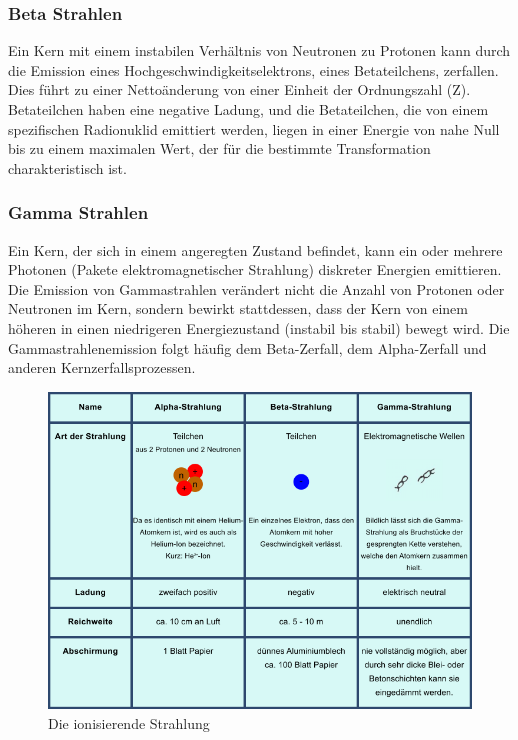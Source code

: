  \subsubsection{Beta Strahlen}
 Ein Kern mit einem instabilen Verhältnis von Neutronen zu Protonen kann durch die Emission eines Hochgeschwindigkeitselektrons, eines Betateilchens, zerfallen. Dies führt zu einer Nettoänderung von einer Einheit der Ordnungszahl (Z). Betateilchen haben eine negative Ladung, und die Betateilchen, die von einem spezifischen Radionuklid emittiert werden, liegen in einer Energie von nahe Null bis zu einem maximalen Wert, der für die bestimmte Transformation charakteristisch ist.
 \subsubsection{Gamma Strahlen}
 Ein Kern, der sich in einem angeregten Zustand befindet, kann ein oder mehrere Photonen (Pakete elektromagnetischer Strahlung) diskreter Energien emittieren. Die Emission von Gammastrahlen verändert nicht die Anzahl von Protonen oder Neutronen im Kern, sondern bewirkt stattdessen, dass der Kern von einem höheren in einen niedrigeren Energiezustand (instabil bis stabil) bewegt wird. Die Gammastrahlenemission folgt häufig dem Beta-Zerfall, dem Alpha-Zerfall und anderen Kernzerfallsprozessen.

\begin{figure}[htb]
  \centering  
  \includegraphics[scale=0.7]{img/strahlen.png}
  \caption{Die ionisierende Strahlung}
  \label{fig:strahlen}
\end{figure}
